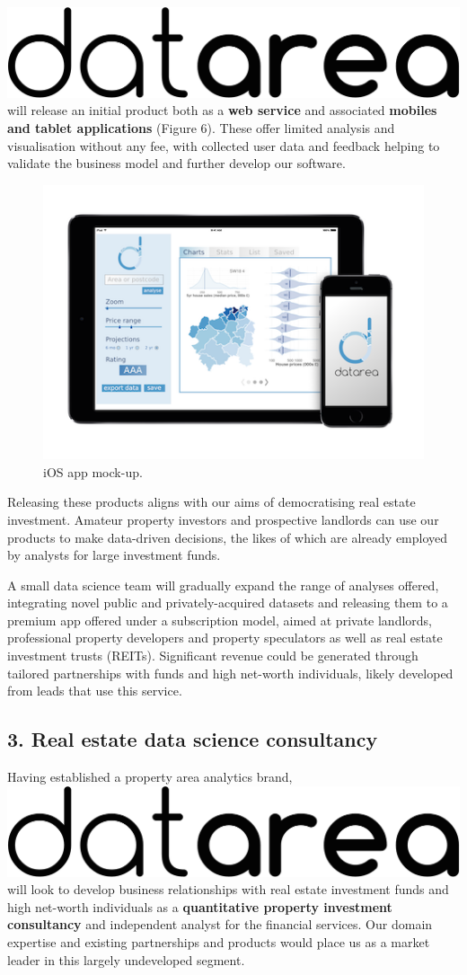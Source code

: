 \documentclass[
10pt, %
a4paper, %
oneside, %
headinclude,footinclude, %
BCOR5mm, %
]{scrartcl}
\newcommand*{\logo}{\includegraphics[scale=.04]{Figures/logotext.png}}
\begin{document}
\logo \hspace{.1em} will release an initial product both as a {\bf web
  service} and associated {\bf mobiles and tablet applications}
(Figure 6). These
offer limited analysis and visualisation without any fee, with
collected user data and feedback helping to validate the business
model and further develop our software.

\begin{figure}
\vspace{.5em}
\centering
\includegraphics[width=.42\textwidth]{Figures/mockup.png}
\caption{ iOS app mock-up.}
\end{figure}

Releasing these products aligns with our aims of democratising real
estate investment. Amateur property investors and prospective
landlords can use our products to make data-driven decisions, the
likes of which are already employed by analysts for large investment
funds.

A small data science team will gradually expand the range of analyses
offered, integrating novel public and privately-acquired datasets and
releasing them to a premium app offered under a subscription model,
aimed at private landlords, professional property developers and
property speculators as well as real estate investment trusts
(REITs). Significant revenue could be generated through tailored
partnerships with funds and high net-worth individuals, likely
developed from leads that use this service.

\subsection*{3. Real estate data science consultancy}

Having established a property area analytics brand, \logo\hspace{.1em}
will look to develop business relationships with real estate
investment funds and high net-worth individuals as a {\bf quantitative
  property investment consultancy} and independent analyst for the
financial services. Our domain expertise and existing partnerships and
products would place us as a market leader in this largely undeveloped
segment.
\end{document}

